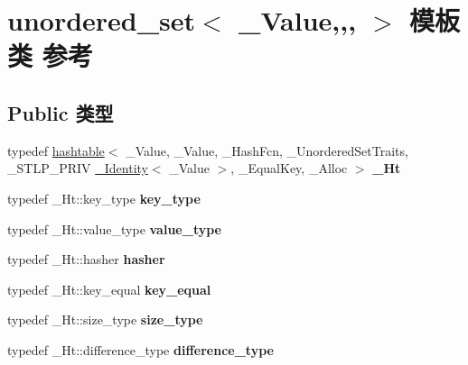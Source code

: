 \hypertarget{classunordered__set}{}\section{unordered\+\_\+set$<$ \+\_\+\+Value,,, $>$ 模板类 参考}
\label{classunordered__set}
\subsection*{Public 类型}
\begin{DoxyCompactItemize}
\item 
\mbox{\label{classunordered__set_af99ec2ea617d7da6fc2e75b41b2a487e}} 
typedef \hyperlink{classhashtable}{hashtable}$<$ \+\_\+\+Value, \+\_\+\+Value, \+\_\+\+Hash\+Fcn, \+\_\+\+Unordered\+Set\+Traits, \+\_\+\+S\+T\+L\+P\+\_\+\+P\+R\+IV \hyperlink{struct___identity}{\+\_\+\+Identity}$<$ \+\_\+\+Value $>$, \+\_\+\+Equal\+Key, \+\_\+\+Alloc $>$ {\bfseries \+\_\+\+Ht}
\item 
\mbox{\label{classunordered__set_aa138ac1b1ab8f4a391662caa5e9a500f}} 
typedef \+\_\+\+Ht\+::key\+\_\+type {\bfseries key\+\_\+type}
\item 
\mbox{\label{classunordered__set_a563ffdbc169cd45329a9fa4fb3536d67}} 
typedef \+\_\+\+Ht\+::value\+\_\+type {\bfseries value\+\_\+type}
\item 
\mbox{\label{classunordered__set_a0cccab4d080829044df2bb5bf6035b60}} 
typedef \+\_\+\+Ht\+::hasher {\bfseries hasher}
\item 
\mbox{\label{classunordered__set_a08f88d39819cc151c0bee0b0245eca4c}} 
typedef \+\_\+\+Ht\+::key\+\_\+equal {\bfseries key\+\_\+equal}
\item 
\mbox{\label{classunordered__set_afe9b38b4e377aa993adc2c928310a2d9}} 
typedef \+\_\+\+Ht\+::size\+\_\+type {\bfseries size\+\_\+type}
\item 
\mbox{\label{classunordered__set_af38f8d012031456c00359d209d548213}} 
typedef \+\_\+\+Ht\+::difference\+\_\+type {\bfseries difference\+\_\+type}

\end{DoxyCompactItemize}
